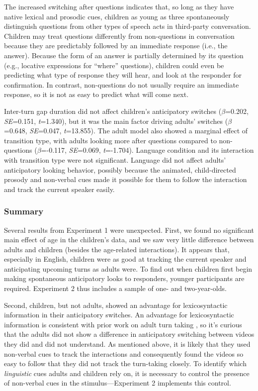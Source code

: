 \documentclass[authoryear, 12pt]{elsarticle}
\begin{document}
The increased switching after questions indicates that, so long as they have native lexical and prosodic cues, children as young as three spontaneously distinguish questions from other types of speech acts in third-party conversation. Children may treat questions differently from non-questions in conversation because they are predictably followed by an immediate response (i.e., the answer). Because the form of an answer is partially determined by its question (e.g., locative expressions for ``where'' questions), children could even be predicting what type of response they will hear, and look at the responder for confirmation. In contrast, non-questions do not usually require an immediate response, so it is not as easy to predict what will come next.

Inter-turn gap duration did not affect children's anticipatory switches (\textit{$\beta$}=0.202, \textit{SE}=0.151, \textit{t}=1.340), but it was the main factor driving adults' switches (\textit{$\beta$}=0.648, \textit{SE}=0.047, \textit{t}=13.855). The adult model also showed a marginal effect of transition type, with adults looking more after questions compared to non-questions (\textit{$\beta$}=-0.117, \textit{SE}=0.069, \textit{t}=-1.704). Language condition and its interaction with transition type were not significant. Language did not affect adults' anticipatory looking behavior, possibly because the animated, child-directed prosody and non-verbal cues made it possible for them to follow the interaction and track the current speaker easily.

\subsubsection{Summary}

Several results from Experiment 1 were unexpected. First, we found no significant main effect of age in the children's data, and we saw very little difference between adults and children (besides the age-related interactions). It appears that, especially in English, children were as good at tracking the current speaker and anticipating upcoming turns as adults were. To find out when children first begin making spontaneous anticipatory looks to responders, younger participants are required. Experiment 2 thus includes a sample of one- and two-year-olds. 

Second, children, but not adults, showed an advantage for lexicosyntactic information in their anticipatory switches. An advantage for lexicosyntactic information is consistent with prior work on adult turn taking \citep{de-ruiter2006}, so it's curious that the adults did not show a difference in anticipatory switching between videos they did and did not understand. As mentioned above, it is likely that they used non-verbal cues to track the interactions and consequently found the videos so easy to follow that they did not track the turn-taking closely. To identify which \textit{linguistic} cues adults and children rely on, it is necessary to control the presence of non-verbal cues in the stimulus---Experiment 2 implements this control.
\end{document}
